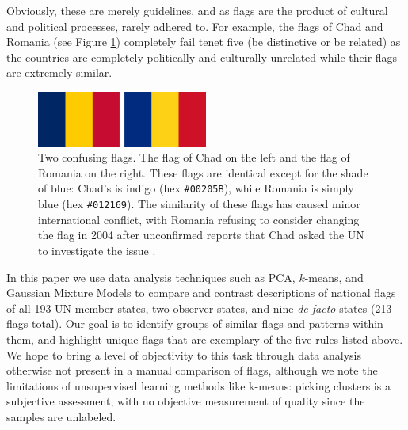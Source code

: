 \documentclass[11pt]{amsart}
\newcommand{\todo}[1]{\textcolor{red}{TODO: #1}}
\begin{document}
Obviously, these are merely guidelines, and as flags are the product of cultural
and political processes, rarely adhered to. For example, the flags of Chad and
Romania (see Figure \ref{fig:chad-romania}) completely fail tenet five (be
distinctive or be related) as the countries are completely politically and
culturally unrelated while their flags are extremely similar.

\begin{figure}[h!]
    \centering
    \includegraphics[width=0.5\textwidth]{./res/left_chad_right_romania.png}
    \caption{Two confusing flags. The flag of Chad on the left and the flag of
    Romania on the right. These flags are identical except for the shade of
    blue: Chad's is indigo (hex \texttt{\#00205B}), while Romania is simply blue (hex
    \texttt{\#012169}). The similarity of these flags has caused minor international
    conflict, with Romania refusing to consider changing the flag in 2004 after
    unconfirmed reports that Chad asked the UN to investigate the issue
    \cite{bbc-identical-flag}. \label{fig:chad-romania}}
\end{figure}

In this paper we use data analysis techniques such as PCA, \(k\)-means, and
Gaussian Mixture Models to compare and contrast descriptions of national flags
of all 193 UN member states, two observer states, and nine \emph{de facto}
states (213 flags total). Our goal is to identify groups of similar flags and
patterns within them, and highlight unique flags that are exemplary of the five
rules listed above. We hope to bring a level of objectivity to this task through
data analysis otherwise not present in a manual comparison of flags, although we
note the limitations of unsupervised learning methods like k-means: picking
clusters is a subjective assessment, with no objective measurement of quality
since the samples are unlabeled.

\end{document}
